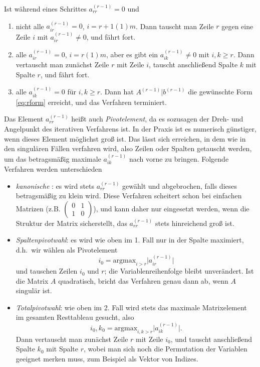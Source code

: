 Ist während eines Schrittes $a_{rr}^{(r-1)} = 0$ und
\begin{enumerate}
\item nicht alle $a_{ir}^{(r-1)}=0$, $i=r+1(1)m$. Dann tauscht man
  Zeile $r$ gegen eine Zeile $i$ mit $a_{ir}^{(r-1)}\neq 0$, und fährt
  fort.
\item alle $a_{ir}^{(r-1)}=0$, $i=r(1)m$, aber es gibt ein
  $a_{ik}^{(r-1)}\neq 0$ mit $i,k\ge r$. Dann vertauscht man zunächst
  Zeile $r$ mit Zeile $i$, tauscht anschließend Spalte $k$ mit
  Spalte $r$, und fährt fort.
\item alle $a_{ik}^{(r-1)}=0$ für $i,k \ge r$. Dann hat
  $A^{(r-1)}|b^{(r-1)}$ die gewünschte Form \eqref{eq:rform} erreicht,
  und das Verfahren terminiert.
\end{enumerate}

Das Element $a_{rr}^{(r-1)}$ heißt auch \emph{Pivotelement}, da es
sozusagen der Dreh- und Angelpunkt des iterativen Verfahrens ist.  In
der Praxis ist es numerisch günstiger, wenn dieses Element möglichst
groß ist. Das lässt sich erreichen, in dem wie in den singulären
Fällen verfahren wird, also Zeilen oder Spalten getauscht werden, um
das betragsmäßig maximale $a_{ik}^{(r-1)}$ nach vorne zu
bringen. Folgende Verfahren werden unterschieden
\begin{itemize}
\item \emph{kanonische }: es wird stets
  $a_{rr}^{(r-1)}$ gewählt und abgebrochen, falls dieses betragsmäßig
  zu klein wird. Diese Verfahren scheitert schon bei einfachen
  Matrizen (z.B. {\tiny $\begin{pmatrix} 0 & 1\\ 1 &
      0\end{pmatrix}$}), und kann daher nur eingesetzt werden, wenn
  die Struktur der Matrix sicherstellt, das $a_{rr}^{(r-1)}$ stets
  hinreichend groß ist.
\item \emph{Spaltenpivotwahl}: es wird wie oben im 1. Fall nur in der
  Spalte maximiert, d.h.\ wir wählen als  Pivotelement
  \begin{equation}
    i_0 = \text{argmax}_{i>r} \lvert a_{ir}^{(r-1)}\rvert
  \end{equation}
  und tauschen Zeilen $i_0$ und $r$; die Variablenreihenfolge bleibt
  unverändert. Ist die Matrix $A$ quadratisch, bricht das Verfahren
  genau dann ab, wenn $A$ singulär ist.
\item \emph{Totalpivotwahl}: wie oben im 2. Fall wird stets das maximale
  Matrixelement im gesamten Resttableau gesucht, also
  \begin{equation}
    i_0,k_0 = \text{argmax}_{i,k>r} \lvert a_{ik}^{(r-1)}\rvert.
  \end{equation}
  Dann vertauscht man zunächst Zeile $r$ mit Zeile $i_0$, und tauscht
  anschließend Spalte $k_0$ mit Spalte $r$, wobei man sich noch die
  Permutation der Variablen geeignet merken muss, zum Beispiel als
  Vektor von Indizes.
\end{itemize}

